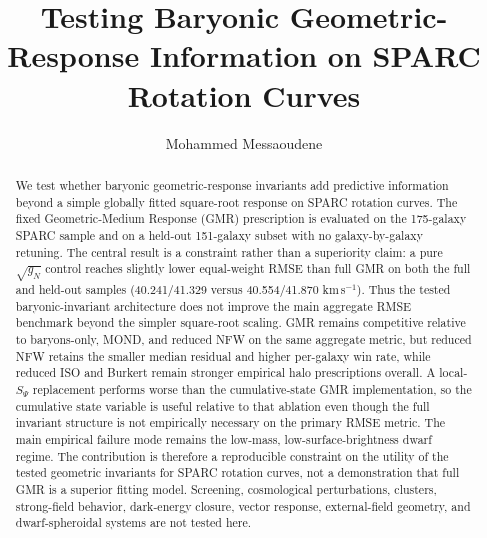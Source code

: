 ﻿\documentclass[twocolumn]{aastex701}
\begin{document}
\pagestyle{plain}

 \title{Testing Baryonic Geometric-Response Information on SPARC Rotation Curves}
 \author{Mohammed Messaoudene}
\begin{abstract}
We test whether baryonic geometric-response invariants add predictive information beyond a simple globally fitted square-root response on SPARC rotation curves. The fixed Geometric-Medium Response (GMR) prescription is evaluated on the 175-galaxy SPARC sample and on a held-out 151-galaxy subset with no galaxy-by-galaxy retuning. The central result is a constraint rather than a superiority claim: a pure $\sqrt{g_N}$ control reaches slightly lower equal-weight RMSE than full GMR on both the full and held-out samples (40.241/41.329 versus 40.554/41.870 km\,s$^{-1}$). Thus the tested baryonic-invariant architecture does not improve the main aggregate RMSE benchmark beyond the simpler square-root scaling. GMR remains competitive relative to baryons-only, MOND, and reduced NFW on the same aggregate metric, but reduced NFW retains the smaller median residual and higher per-galaxy win rate, while reduced ISO and Burkert remain stronger empirical halo prescriptions overall. A local-$S_\Psi$ replacement performs worse than the cumulative-state GMR implementation, so the cumulative state variable is useful relative to that ablation even though the full invariant structure is not empirically necessary on the primary RMSE metric. The main empirical failure mode remains the low-mass, low-surface-brightness dwarf regime. The contribution is therefore a reproducible constraint on the utility of the tested geometric invariants for SPARC rotation curves, not a demonstration that full GMR is a superior fitting model. Screening, cosmological perturbations, clusters, strong-field behavior, dark-energy closure, vector response, external-field geometry, and dwarf-spheroidal systems are not tested here.
\end{abstract}
\end{document}

